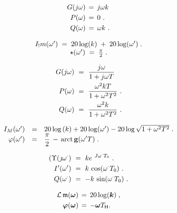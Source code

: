 \documentclass{article}
\begin{document}
\[
$$
\begin{aligned} {G ( j \omega)} & {{} \,=\, j \omega k \,} \\ {P ( \omega)} & {{} \,=\, 0 \ .} \\ {Q ( \omega)} & {{} \,=\, \omega k \ .} \\ \end{aligned}
$$
\]

\[
$$
\begin{array} {c} {I_{\mathrm{!}} m ( \omega^{\prime} ) \;=\; 2 0 \log( k ) \;+\; 2 0 \log( \omega^{\prime} ) \;.} \\ {\star( \omega^{\prime} ) \;=\; \frac{\pi} {2} \;.} \\ \end{array}
$$
\]

\[
$$
\begin{aligned} {G ( j \omega)} & {{} \ =\ \frac{j \omega} {1+j \omega T} \,} \\ {P ( \omega)} & {{} \ =\ \frac{\omega^{2} k T} {1+\omega^{2} T^{2}} \ .} \\ {Q ( \omega)} & {{} \ =\ \frac{\omega^{2} k} {1+\omega^{2} T^{2}} \ .} \\ \end{aligned}
$$
\]

\[
$$
\begin{array} {r c l} {{I_{M} ( \omega^{\prime} )}} & {{=}} & {{2 0 \log\left( k \right)+2 0 \log( \omega^{\prime} )-2 0 \log\sqrt{1+\omega^{2} T^{2}} \;.}} \\ {{\varphi( \omega^{\prime} )}} & {{=}} & {{\displaystyle\frac{\pi} {2} \,-\, \operatorname{a r c t} \mathbf{g} ( \omega^{\prime} T ) \;.}} \end{array}
$$
\]

\[
$$
\begin{aligned} {( \Upsilon( \jmath\omega^{\cdot} )} & {{} ~=~ k e^{~ J \omega^{\cdot} T_{0}} ~.} \\ {I^{\prime} ( \omega^{\prime} )} & {{} ~=~ k ~ \mathrm{c o s} ( \omega^{\cdot} T_{0} ) ~.} \\ {Q ( \omega^{\cdot} )} & {{} ~=~-k ~ \mathrm{s i n} ( \omega^{\cdot} T_{0} ) ~.} \\ \end{aligned}
$$
\]

\[
$$
\begin{aligned} {\mathcal{L} \, \mathfrak{m} ( \boldsymbol{\omega} )} & {{} \,=\, 2 0 \operatorname{l o g} ( \boldsymbol{k} ) \;,} \\ {\boldsymbol{\varphi} ( \boldsymbol{\omega} )} & {{} \,=\,-\boldsymbol{\omega} T_{\mathsf{H}}.} \\ \end{aligned}
$$
\]
\end{document}
